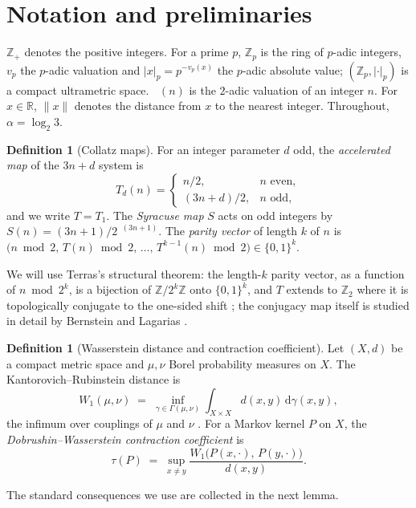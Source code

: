 \documentclass[11pt]{amsart}
\theoremstyle{definition}
\newtheorem{definition}[theorem]{Definition}
\theoremstyle{remark}
\newcommand{\Z}{\mathbb{Z}}
\newcommand{\R}{\mathbb{R}}
\newcommand{\Ztwo}{\Z_2}
\newcommand{\dW}{W_1}
\DeclareMathOperator{\nutwo}{\nu_2}
\begin{document}
\section{Notation and preliminaries}\label{sec:notation}

$\Z_+$ denotes the positive integers. For a prime $p$, $\Z_p$ is the ring of $p$-adic integers, $v_p$ the $p$-adic valuation and $|x|_p = p^{-v_p(x)}$ the $p$-adic absolute value; $(\Z_p, |\cdot|_p)$ is a compact ultrametric space. $\nutwo(n)$ is the $2$-adic valuation of an integer $n$. For $x\in\R$, $\|x\|$ denotes the distance from $x$ to the nearest integer. Throughout, $\alpha = \log_2 3$.

\begin{definition}[Collatz maps]\label{def:maps}
For an integer parameter $d$ odd, the \emph{accelerated map} of the $3n+d$ system is
\[
T_d(n)=\begin{cases} n/2, & n \text{ even},\\ (3n+d)/2, & n \text{ odd},\end{cases}
\]
and we write $T = T_1$. The \emph{Syracuse map} $S$ acts on odd integers by $S(n) = (3n+1)/2^{\nutwo(3n+1)}$. The \emph{parity vector} of length $k$ of $n$ is $\bigl(n \bmod 2,\, T(n) \bmod 2,\, \dots,\, T^{k-1}(n) \bmod 2\bigr) \in \{0,1\}^k$.
\end{definition}

We will use Terras's structural theorem: the length-$k$ parity vector, as a function of $n \bmod 2^k$, is a bijection of $\Z/2^k\Z$ onto $\{0,1\}^k$, and $T$ extends to $\Ztwo$ where it is topologically conjugate to the one-sided shift \cite{terras1976,lagarias1985}; the conjugacy map itself is studied in detail by Bernstein and Lagarias \cite{bernsteinlagarias1996}.

\begin{definition}[Wasserstein distance and contraction coefficient]\label{def:w1}
Let $(X,d)$ be a compact metric space and $\mu,\nu$ Borel probability measures on $X$. The Kantorovich--Rubinstein distance is
\[
\dW(\mu,\nu) \;=\; \inf_{\gamma \in \Gamma(\mu,\nu)} \int_{X\times X} d(x,y)\, \mathrm{d}\gamma(x,y),
\]
the infimum over couplings of $\mu$ and $\nu$ \cite[Ch.~6]{villani2009}. For a Markov kernel $P$ on $X$, the \emph{Dobrushin--Wasserstein contraction coefficient} is
\[
\tau(P) \;=\; \sup_{x \neq y} \frac{\dW\bigl(P(x,\cdot),\,P(y,\cdot)\bigr)}{d(x,y)}.
\]
\end{definition}

The standard consequences we use are collected in the next lemma.
\end{document}

